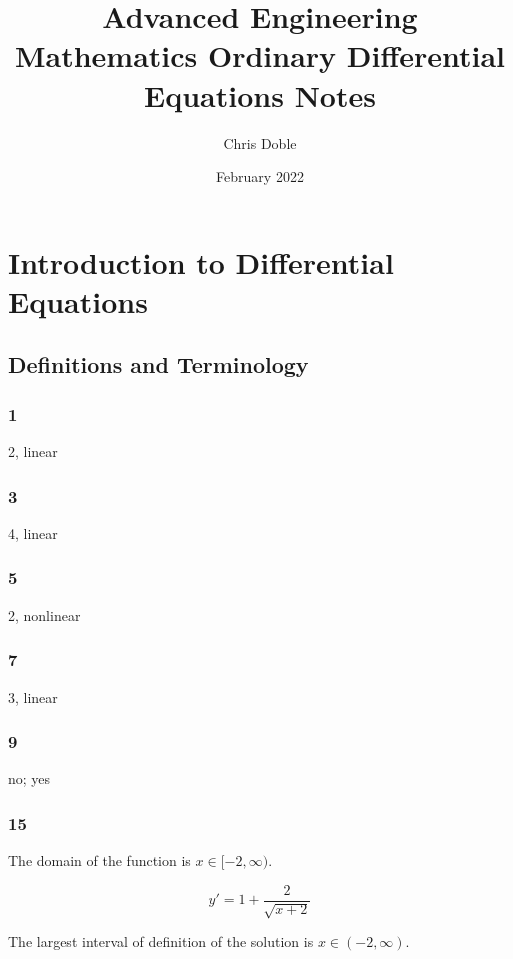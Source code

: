 \documentclass{article}
\title{Advanced Engineering Mathematics Ordinary Differential Equations Notes}
\author{Chris Doble}
\date{February 2022}
\begin{document}
\maketitle

\tableofcontents

\section{Introduction to Differential Equations}

\subsection{Definitions and Terminology}

\subsubsection{1}

2, linear

\subsubsection{3}

4, linear

\subsubsection{5}

2, nonlinear

\subsubsection{7}

3, linear

\subsubsection{9}

no; yes

\subsubsection{15}

The domain of the function is $x \in [-2, \infty)$.

\[y' = 1 + \frac{2}{\sqrt{x + 2}}\]

The largest interval of definition of the solution is $x \in (-2, \infty)$.
\end{document}
